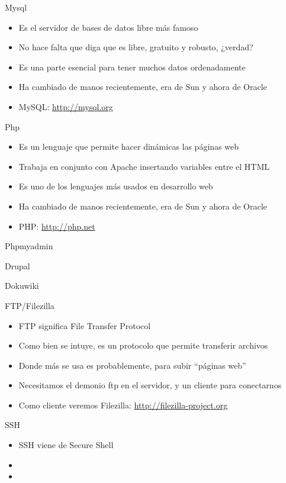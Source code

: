 \documentclass[spanish]{beamer}
\begin{document}
\begin{frame}{Mysql}
\begin{itemize}
\item Es el servidor de bases de datos libre más famoso
\item No hace falta que diga que es libre, gratuito y robusto, ¿verdad?
\item Es una parte esencial para tener muchos datos ordenadamente
\item Ha cambiado de manos recientemente, era de Sun y ahora de Oracle
\item MySQL: \url{http://mysql.org}
\end{itemize}
\end{frame}
\begin{frame}{Php}
\begin{itemize}
\item Es un lenguaje que permite hacer dinámicas las páginas web
\item Trabaja en conjunto con Apache insertando variables entre el HTML
\item Es uno de los lenguajes más usados en desarrollo web
\item Ha cambiado de manos recientemente, era de Sun y ahora de Oracle
\item PHP: \url{http://php.net}
\end{itemize}
\end{frame}
\begin{frame}{Phpmyadmin}
\end{frame}
\begin{frame}{Drupal}
\end{frame}
\begin{frame}{Dokuwiki}
\end{frame}
\begin{frame}{FTP/Filezilla}
\begin{itemize}
\item FTP significa File Transfer Protocol
\item Como bien se intuye, es un protocolo que permite transferir archivos
\item Donde más se usa es probablemente, para subir ``páginas web''
\item Necesitamos el demonio ftp en el servidor, y un cliente para conectarnos
\item Como cliente veremos Filezilla: \url{http://filezilla-project.org}
\end{itemize}
\end{frame}
\begin{frame}{SSH}
\begin{itemize}
\item SSH viene de Secure Shell
\item 
\item 
\end{itemize}
\end{frame}
\end{document}
